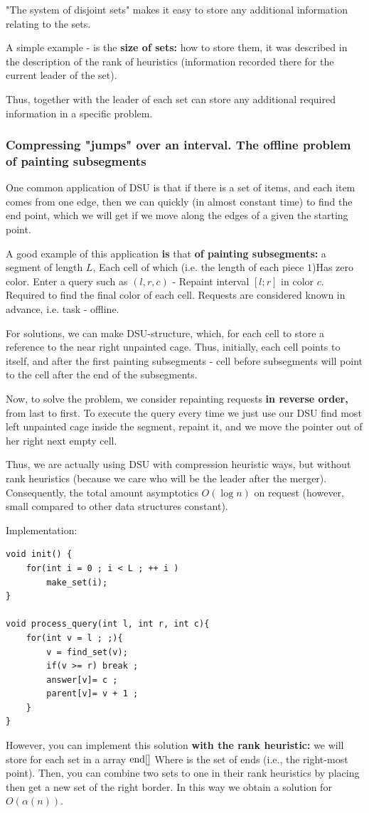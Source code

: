 "The system of disjoint sets" makes it easy to store any additional information relating to the sets.

A simple example - is the \textbf{size of sets:} how to store them, it was described in the description of the rank of heuristics (information recorded there for the current leader of the set).

Thus, together with the leader of each set can store any additional required information in a specific problem.

\subsubsection{ Compressing "jumps" over an interval. The offline problem of painting subsegments }

One common application of DSU is that if there is a set of items, and each item comes from one edge, then we can quickly (in almost constant time) to find the end point, which we will get if we move along the edges of a given the starting point.

A good example of this application \textbf{is} that \textbf{of painting subsegments:} a segment of length $L$, Each cell of which (i.e. the length of each piece $1$)Has zero color. Enter a query such as $(l, r, c)$ - Repaint interval $[l; r]$ in color $c$. Required to find the final color of each cell. Requests are considered known in advance, i.e. task - offline.

For solutions, we can make DSU-structure, which, for each cell to store a reference to the near right unpainted cage. Thus, initially, each cell points to itself, and after the first painting subsegments - cell before subsegments will point to the cell after the end of the subsegments.

Now, to solve the problem, we consider repainting requests \textbf{in reverse order,} from last to first. To execute the query every time we just use our DSU find most left unpainted cage inside the segment, repaint it, and we move the pointer out of her right next empty cell.

Thus, we are actually using DSU with compression heuristic ways, but without rank heuristics (because we care who will be the leader after the merger). Consequently, the total amount asymptotics $O (\log n)$ on request (however, small compared to other data structures constant).

Implementation:

\begin{verbatim}
void init() {
    for(int i = 0 ; i < L ; ++ i )
        make_set(i);
}
 
void process_query(int l, int r, int c){
    for(int v = l ; ;){
        v = find_set(v);
        if(v >= r) break ;
        answer[v]= c ;
        parent[v]= v + 1 ;
    }
} 
\end{verbatim}
However, you can implement this solution \textbf{with the rank heuristic:} we will store for each set in a array ${\rm end} []$ Where is the set of ends (i.e., the right-most point). Then, you can combine two sets to one in their rank heuristics by placing then get a new set of the right border. In this way we obtain a solution for $O (\alpha (n))$.

